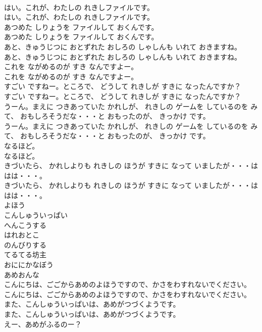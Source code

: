 \documentclass[8pt]{extreport}
\begin{document}
\begin{CJK}{UTF8}{min}
\\	はい。これが、わたしの れきしファイルです。	
\\	はい。これが、わたしの れきしファイルです。 
\\	あつめた しりょうを ファイルして おくんです。	
\\	あつめた しりょうを ファイルして おくんです。 
\\	あと、きゅうじつに おとずれた おしろの しゃしんも いれて おきますね。	
\\	あと、きゅうじつに おとずれた おしろの しゃしんも いれて おきますね。 
\\	これを ながめるのが すき なんですよー。	
\\	これを ながめるのが すき なんですよー。 
\\	すごい ですねー。ところで、 どうして れきしが すきに なったんですか？	
\\	すごい ですねー。ところで、 どうして れきしが すきに なったんですか？ 
\\	うーん。まえに つきあっていた かれしが、 れきしの ゲームを しているのを みて、 おもしろそうだな・・・と おもったのが、 きっかけ です。	
\\	うーん。まえに つきあっていた かれしが、 れきしの ゲームを しているのを みて、 おもしろそうだな・・・と おもったのが、 きっかけ です。 
\\	なるほど。	
\\	なるほど。 
\\	きづいたら、 かれしよりも れきしの ほうが すきに なって いましたが・・・ははは・・・。	
\\	きづいたら、 かれしよりも れきしの ほうが すきに なって いましたが・・・ははは・・・。 
\\	よほう
\\	こんしゅういっぱい
\\	へんこうする
\\	はれおとこ
\\	のんびりする
\\	てるてる坊主
\\	おににかなぼう
\\	あめおんな
\\	こんにちは、ごごからあめのよほうですので、かさをわすれないでください。	
\\	こんにちは、ごごからあめのよほうですので、かさをわすれないでください。 
\\	また、こんしゅういっぱいは、あめがつづくようです。	
\\	また、こんしゅういっぱいは、あめがつづくようです。 
\\	えー、あめがふるのー？	

\end{CJK}
\end{document}
